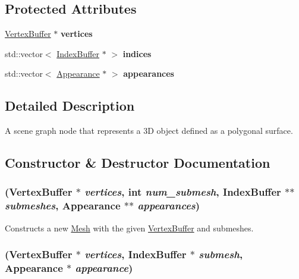 \subsection*{Protected Attributes}
\begin{CompactItemize}
\item 
\hypertarget{classm3g_1_1Mesh_1a2db0a8bc6986ba148b6b6f5dee271f}{
\hyperlink{classm3g_1_1VertexBuffer}{VertexBuffer} $\ast$ \textbf{vertices}}
\label{classm3g_1_1Mesh_1a2db0a8bc6986ba148b6b6f5dee271f}

\item 
\hypertarget{classm3g_1_1Mesh_7280e670882c2ce658bd600655fb477e}{
std::vector$<$ \hyperlink{classm3g_1_1IndexBuffer}{IndexBuffer} $\ast$ $>$ \textbf{indices}}
\label{classm3g_1_1Mesh_7280e670882c2ce658bd600655fb477e}

\item 
\hypertarget{classm3g_1_1Mesh_6dcb9adb660a04b601286a3ce4500fba}{
std::vector$<$ \hyperlink{classm3g_1_1Appearance}{Appearance} $\ast$ $>$ \textbf{appearances}}
\label{classm3g_1_1Mesh_6dcb9adb660a04b601286a3ce4500fba}

\end{CompactItemize}


\subsection{Detailed Description}
A scene graph node that represents a 3D object defined as a polygonal surface. 

\subsection{Constructor \& Destructor Documentation}
\hypertarget{classm3g_1_1Mesh_f2c80c243fdcd32b07c77d2ab3d565ab}{
\subsubsection[{Mesh}]{ ({\bf VertexBuffer} $\ast$ {\em vertices}, \/  int {\em num\_\-submesh}, \/  {\bf IndexBuffer} $\ast$$\ast$ {\em submeshes}, \/  {\bf Appearance} $\ast$$\ast$ {\em appearances})}}
\label{classm3g_1_1Mesh_f2c80c243fdcd32b07c77d2ab3d565ab}


Constructs a new \hyperlink{classm3g_1_1Mesh}{Mesh} with the given \hyperlink{classm3g_1_1VertexBuffer}{VertexBuffer} and submeshes. \hypertarget{classm3g_1_1Mesh_2d7766ebbb63eccd77d0dd8b53b400a3}{
\subsubsection[{Mesh}]{ ({\bf VertexBuffer} $\ast$ {\em vertices}, \/  {\bf IndexBuffer} $\ast$ {\em submesh}, \/  {\bf Appearance} $\ast$ {\em appearance})}}
\label{classm3g_1_1Mesh_2d7766ebbb63eccd77d0dd8b53b400a3}


